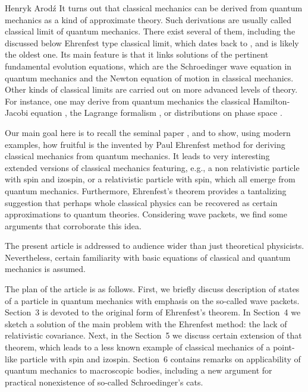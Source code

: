 \begin{artengenv}{Henryk Arod\'z}
 It turns out that classical mechanics can be derived from quantum mechanics as a kind of approximate theory. Such derivations are usually called classical limit of quantum mechanics. There exist several of them, including the discussed below Ehrenfest type classical limit, which dates back to \cite*{ehr}, and is likely the oldest one. Its main feature is that it links solutions of the pertinent fundamental evolution equations, which are the Schroedinger wave equation in quantum mechanics and the Newton equation of motion in classical mechanics. Other kinds of classical limits are carried out on more advanced levels of theory. For instance, one may derive from quantum mechanics the classical Hamilton-Jacobi equation \parencite[see, e.g.][chap.8, sec.34]{WKB}, the Lagrange formalism \parencite[see, e.g.][chap.1, sec.2]{pathint}, or distributions on phase space \parencite[see, e.g.][]{siegel,wignerdistr}.



Our main goal here is to recall the seminal paper \parencite{ehr}, and to show, using modern examples, how fruitful is the invented by Paul Ehrenfest method for deriving classical mechanics from quantum mechanics. It leads to very interesting extended versions of classical mechanics featuring, e.g., a non relativistic particle with spin and izospin, or a relativistic particle with spin, which all emerge from quantum mechanics. Furthermore, Ehrenfest's theorem provides a tantalizing suggestion that perhaps whole classical physics can be recovered as certain approximations to quantum theories. Considering wave packets, we find some arguments that corroborate this idea. 

 

The present article is addressed to audience wider than just theoretical physicists. Nevertheless, certain familiarity with basic equations of classical and quantum mechanics is assumed. 






The plan of the article is as follows. First, we briefly discuss description of states of a particle in quantum mechanics with emphasis on the so-called wave packets. Section~3 
is devoted to the original form of Ehrenfest's theorem. In Section~4 we sketch a solution of the main problem with the Ehrenfest method: the lack of relativistic covariance. 
Next, in the Section~5 we discuss certain extension of that theorem, which leads to a less known example of classical mechanics of a point-like particle with spin and izospin. Section~6 contains remarks on applicability of quantum mechanics to macroscopic bodies, including a new argument for practical nonexistence of so-called Schroedinger's cats. 













\end{artengenv}
